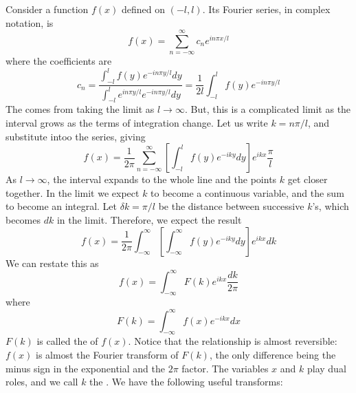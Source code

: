 \documentclass[12pt, a4paper, oneside, openright, titlepage]{book}
\begin{document}
Consider a function $f(x)$ defined on $(-l,l)$. Its Fourier series, in complex notation, is \begin{equation*}
    f(x) = \sum_{n=-\infty}^{\infty}c_ne^{in\pi x/l}
\end{equation*}
where the coefficients are \begin{equation*}
    c_n = \frac{\int_{-l}^lf(y)e^{-in\pi y/l}dy}{\int_{-l}^le^{in\pi y/l}e^{-in\pi y/l}dy} = \frac{1}{2l}\int_{-l}^lf(y)e^{-in\pi y/l}
\end{equation*}
The  comes from taking the limit as $l\rightarrow \infty$. But, this is a complicated limit as the interval grows as the terms of integration change. Let us write $k = n\pi/l$, and substitute intoo the series, giving \begin{equation*}
    f(x) = \frac{1}{2\pi}\sum_{n=-\infty}^{\infty}\left[\int_{-l}^lf(y)e^{-iky}dy\right]e^{ikx}\frac{\pi}{l}
\end{equation*}
As $l\rightarrow \infty$, the interval expands to the whole line and the points $k$ get closer together. In the limit we expect $k$ to become a continuous variable, and the sum to become an integral. Let $\delta k = \pi/l$ be the distance between successive $k$'s, which becomes $dk$ in the limit. Therefore, we expect the result \begin{equation*}
    f(x) = \frac{1}{2\pi}\int_{-\infty}^{\infty}\left[\int_{-\infty}^{\infty}f(y)e^{-iky}dy\right]e^{ikx}dk
\end{equation*}
We can restate this as \begin{equation}
    \boxed{f(x) = \int_{-\infty}^{\infty}F(k)e^{ikx}\frac{dk}{2\pi}}
\end{equation}
where \begin{equation}
    \boxed{F(k) = \int_{-\infty}^{\infty}f(x)e^{-ikx}dx}
\end{equation}
$F(k)$ is called the  of $f(x)$. Notice that the relationship is almost reversible: $f(x)$ is almost the Fourier transform of $F(k)$, the only difference being the minus sign in the exponential and the $2\pi$ factor. The variables $x$ and $k$ play dual roles, and we call $k$ the . We have the following useful transforms:
\end{document}
